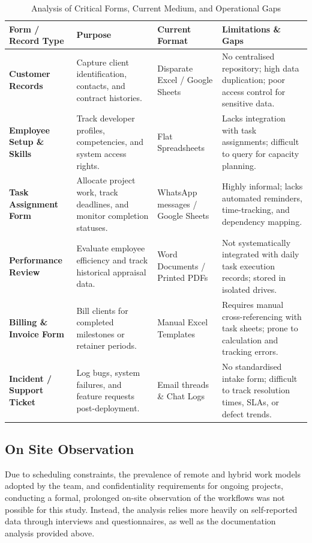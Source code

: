 \documentclass[12pt,a4paper]{report}
\begin{document}
\begin{table}[H]
\centering
\renewcommand{\arraystretch}{1.35}
\small
\begin{tabularx}{\textwidth}{|p{2.6cm}|X|p{2.3cm}|X|}
\hline
\rowcolor{secondary}
\textbf{Form / Record Type} & \textbf{Purpose} & \textbf{Current Format} & \textbf{Limitations \& Gaps} \\
\hline
\textbf{Customer Records} & Capture client identification, contacts, and contract histories. & Disparate Excel / Google Sheets & No centralised repository; high data duplication; poor access control for sensitive data. \\
\hline
\textbf{Employee Setup \& Skills} & Track developer profiles, competencies, and system access rights. & Flat Spreadsheets & Lacks integration with task assignments; difficult to query for capacity planning. \\
\hline
\textbf{Task Assignment Form} & Allocate project work, track deadlines, and monitor completion statuses. & WhatsApp messages / Google Sheets & Highly informal; lacks automated reminders, time-tracking, and dependency mapping. \\
\hline
\textbf{Performance Review} & Evaluate employee efficiency and track historical appraisal data. & Word Documents / Printed PDFs & Not systematically integrated with daily task execution records; stored in isolated drives. \\
\hline
\textbf{Billing \& Invoice Form} & Bill clients for completed milestones or retainer periods. & Manual Excel Templates & Requires manual cross-referencing with task sheets; prone to calculation and tracking errors. \\
\hline
\textbf{Incident / Support Ticket} & Log bugs, system failures, and feature requests post-deployment. & Email threads \& Chat Logs & No standardised intake form; difficult to track resolution times, SLAs, or defect trends. \\
\hline
\end{tabularx}
\caption{Analysis of Critical Forms, Current Medium, and Operational Gaps}
\end{table}

\subsection{On Site Observation}
Due to scheduling constraints, the prevalence of remote and hybrid work models adopted by the team, and confidentiality requirements for ongoing projects, conducting a formal, prolonged on-site observation of the workflows was not possible for this study. Instead, the analysis relies more heavily on self-reported data through interviews and questionnaires, as well as the documentation analysis provided above.
\end{document}
